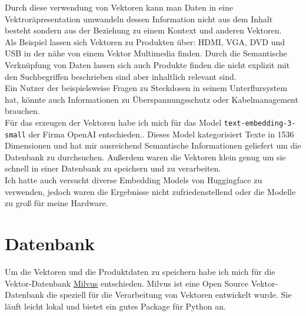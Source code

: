 Durch diese verwendung von Vektoren kann man Daten in eine Vektroräpresentation umwandeln dessen Information nicht aus dem Inhalt besteht sondern aus
der Beziehung zu einem Kontext und anderen Vektoren.\\
Als Beispiel lassen sich Vektoren zu Produkten über: HDMI, VGA, DVD und USB in der nähe von einem Vektor Multimedia finden.
Durch die Semantische Verknüpfung von Daten lassen sich auch Produkte finden die nicht explizit mit den Suchbegriffen beschrieben sind aber inhaltlich
relevant sind.\\
Ein Nutzer der beispielsweise Fragen zu Steckdosen in seinem Unterflursystem hat, könnte auch Informationen zu Überspannungsschutz oder Kabelmanagement brauchen.\\
Für das erzeugen der Vektoren habe ich mich für das Model \lstinline|text-embedding-3-small| der Firma OpenAI entschieden.\cite{openai:Embeddings}.
Dieses Model kategorisiert Texte in 1536 Dimensionen und hat mir ausreichend Semantische Informationen geliefert um die Datenbank zu durchsuchen.
Außerdem waren die Vektoren klein genug um sie schnell in einer Datenbank zu speichern und zu verarbeiten.\\
Ich hatte auch versucht diverse Embedding Models von Huggingface zu verwenden, jedoch waren die Ergebnisse nicht zufriedenstellend oder die Modelle zu groß für meine Hardware.\\

\section{Datenbank}\label{sec:umsetzung_db}
Um die Vektoren und die Produktdaten zu speichern habe ich mich für die Vektor-Datenbank \href{https://milvus.io/}{Milvus} entschieden.
Milvus ist eine Open Source Vektor-Datenbank die speziell für die Verarbeitung von Vektoren entwickelt wurde.
Sie läuft leicht lokal und bietet ein gutes Package für Python an.\\